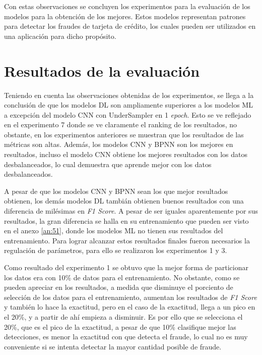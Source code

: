 Con estas observaciones se concluyen los experimentos para la evaluaci\'{o}n de los modelos para la obtenci\'{o}n de los mejores. Estos modelos representan patrones para detectar los fraudes de tarjeta de cr\'{e}dito, los cuales pueden ser utilizados en una aplicaci\'{o}n para dicho prop\'{o}sito.

\section{Resultados de la evaluaci\'{o}n}

  Teniendo en cuenta las observaciones obtenidas de los experimentos, se llega a la conclusi\'{o}n de que los modelos DL son ampliamente superiores a los modelos ML a excepci\'{o}n del modelo CNN con UnderSampler en 1 \textit{epoch}. Esto se ve reflejado en el experimento 7 donde se ve claramente el ranking de los resultados, no obstante, en los experimentos anteriores se muestran que los resultados de las m\'{e}tricas son altas. Adem\'{a}s, los modelos CNN y BPNN son los mejores en resultados, incluso el modelo CNN obtiene los mejores resultados con los datos desbalanceados, lo cual demuestra que aprende mejor con los datos desbalanceados.
  
  A pesar de que los modelos CNN y BPNN sean los que mejor resultados obtienen, los dem\'{a}s modelos DL tambi\'{a}n obtienen buenos resultados con una diferencia de mil\'{e}simas en \textit{F1 Score}. A pesar de ser iguales aparentemente por sus resultados, la gran diferencia se halla en su entrenamiento que pueden ser visto en el anexo \ref{an:51}, donde los modelos ML no tienen sus resultados del entrenamiento. Para lograr alcanzar estos resultados finales fueron necesarios la regulaci\'{o}n de par\'{a}metros, para ello se realizaron los experimentos 1 y 3.

  Como resultado del experimento 1 se obtuvo que la mejor forma de particionar los datos era con 10\% de datos para el entrenamiento. No obstante, como se pueden apreciar en los resultados, a medida que disminuye el porciento de selecci\'{o}n de los datos para el entrenamiento, aumentan los resultados de \textit{F1 Score} y tambi\'{e}n lo hace la exactitud, pero en el caso de la exactitud, llega a un pico en el 20\%, y a partir de ah\'{i} empieza a disminuir. Es por ello que se selecciona el 20\%, que es el pico de la exactitud, a pesar de que 10\% clasifique mejor las detecciones, es menor la exactitud con que detecta el fraude, lo cual no es muy conveniente si se intenta detectar la mayor cantidad posible de fraude.
  
